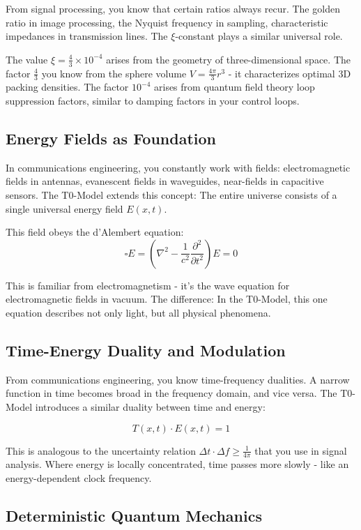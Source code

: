 \documentclass[12pt,a4paper]{article}
\begin{document}
From signal processing, you know that certain ratios always recur. The golden ratio in image processing, the Nyquist frequency in sampling, characteristic impedances in transmission lines. The $\xi$-constant plays a similar universal role.

The value $\xi = \frac{4}{3} \times 10^{-4}$ arises from the geometry of three-dimensional space. The factor $\frac{4}{3}$ you know from the sphere volume $V = \frac{4\pi}{3}r^3$ - it characterizes optimal 3D packing densities. The factor $10^{-4}$ arises from quantum field theory loop suppression factors, similar to damping factors in your control loops.

\subsection{Energy Fields as Foundation}

In communications engineering, you constantly work with fields: electromagnetic fields in antennas, evanescent fields in waveguides, near-fields in capacitive sensors. The T0-Model extends this concept: The entire universe consists of a single universal energy field $E(x,t)$.

This field obeys the d'Alembert equation:
$$\square E = \left(\nabla^2 - \frac{1}{c^2}\frac{\partial^2}{\partial t^2}\right) E = 0$$

This is familiar from electromagnetism - it's the wave equation for electromagnetic fields in vacuum. The difference: In the T0-Model, this one equation describes not only light, but all physical phenomena.

\subsection{Time-Energy Duality and Modulation}

From communications engineering, you know time-frequency dualities. A narrow function in time becomes broad in the frequency domain, and vice versa. The T0-Model introduces a similar duality between time and energy:

$$T(x,t) \cdot E(x,t) = 1$$

This is analogous to the uncertainty relation $\Delta t \cdot \Delta f \geq \frac{1}{4\pi}$ that you use in signal analysis. Where energy is locally concentrated, time passes more slowly - like an energy-dependent clock frequency.

\subsection{Deterministic Quantum Mechanics}
\end{document}
